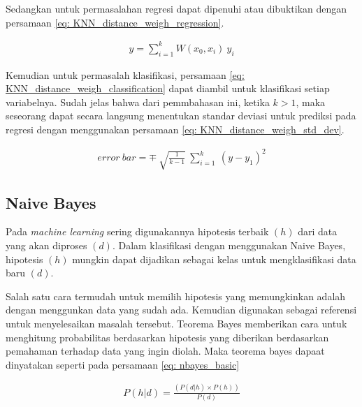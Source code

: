 \begin{enumerate}[label=\textbf{\alph*).}]
	Sedangkan untuk permasalahan regresi dapat dipenuhi atau dibuktikan dengan persamaan \ref{eq: KNN_distance_weigh_regression}.
	
	\begin{equation}\label{eq: KNN_distance_weigh_regression}
	\begin{split}
	y = \sum_{i = 1}^{k} W(x_{0}, x_{i})\ y_{i}
	\end{split}
	\end{equation}
	
	Kemudian untuk permasalah klasifikasi, persamaan \ref{eq: KNN_distance_weigh_classification} dapat diambil untuk klasifikasi setiap variabelnya. Sudah jelas bahwa dari pemmbahasan ini, ketika $k > 1$, maka seseorang dapat secara langsung menentukan standar deviasi untuk prediksi pada regresi dengan menggunakan persamaan \ref{eq: KNN_distance_weigh_std_dev}.
	
	\begin{equation}\label{eq: KNN_distance_weigh_std_dev}
	\begin{split}
	error\ bar = \mp\ \sqrt{\frac{1}{k - 1}}\ \sum_{i = 1}^{k}\ (y - y_{1})^2
	\end{split}
	\end{equation}
	
\end{enumerate}

\subsection{Naive Bayes}
\label{sec:sub_sec2_bayes}
\vspace{1ex}

Pada \textit{machine learning} sering digunakannya hipotesis terbaik $(h)$ dari data yang akan diproses $(d)$. Dalam klasifikasi dengan menggunakan Naive Bayes, hipotesis $(h)$ mungkin dapat dijadikan sebagai kelas untuk mengklasifikasi data baru $(d)$.
\vspace{1ex}

Salah satu cara termudah untuk memilih hipotesis yang memungkinkan adalah dengan menggunkan data yang sudah ada. Kemudian digunakan sebagai referensi untuk menyelesaikan masalah tersebut. Teorema Bayes memberikan cara untuk menghitung probabilitas berdasarkan hipotesis yang diberikan berdasarkan pemahaman terhadap data yang ingin diolah. Maka teorema bayes dapaat dinyatakan seperti pada persamaan \ref{eq: nbayes_basic}

\begin{equation}\label{eq: nbayes_basic}
\begin{split}
P(h|d) = \frac{(P(d|h) \times P(h))}{P(d)}
\end{split}
\end{equation}

